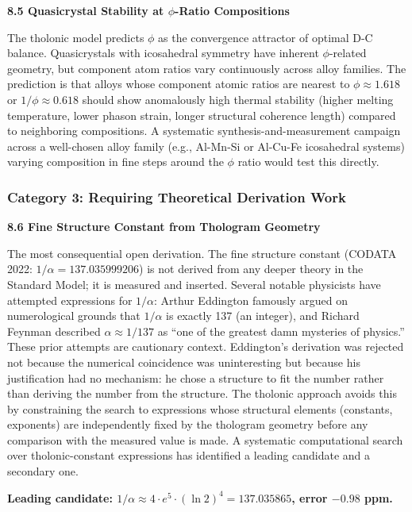 \documentclass[12pt]{article}
\begin{document}
\textbf{8.5 Quasicrystal Stability at \(\phi\)-Ratio Compositions}

The tholonic model predicts \(\phi\) as the convergence attractor of
optimal D-C balance. Quasicrystals with icosahedral symmetry have
inherent \(\phi\)-related geometry, but component atom ratios vary
continuously across alloy families. The prediction is that alloys whose
component atomic ratios are nearest to \(\phi \approx 1.618\) or
\(1/\phi \approx 0.618\) should show anomalously high thermal stability
(higher melting temperature, lower phason strain, longer structural
coherence length) compared to neighboring compositions. A systematic
synthesis-and-measurement campaign across a well-chosen alloy family
(e.g., Al-Mn-Si or Al-Cu-Fe icosahedral systems) varying composition in
fine steps around the \(\phi\) ratio would test this directly.

\subsubsection{Category 3: Requiring Theoretical Derivation
Work}\label{category-3-requiring-theoretical-derivation-work}

\textbf{8.6 Fine Structure Constant from Thologram Geometry}

The most consequential open derivation. The fine structure constant
(CODATA 2022: \(1/\alpha = 137.035999206\)) is not derived from any
deeper theory in the Standard Model; it is measured and inserted.
Several notable physicists have attempted expressions for \(1/\alpha\):
Arthur Eddington famously argued on numerological grounds that
\(1/\alpha\) is exactly 137 (an integer), and Richard Feynman described
\(\alpha \approx 1/137\) as ``one of the greatest damn mysteries of
physics.'' These prior attempts are cautionary context. Eddington's
derivation was rejected not because the numerical coincidence was
uninteresting but because his justification had no mechanism: he chose a
structure to fit the number rather than deriving the number from the
structure. The tholonic approach avoids this by constraining the search
to expressions whose structural elements (constants, exponents) are
independently fixed by the thologram geometry before any comparison with
the measured value is made. A systematic computational search over
tholonic-constant expressions has identified a leading candidate and a
secondary one.

\textbf{Leading candidate:
\(1/\alpha \approx 4 \cdot e^5 \cdot (\ln 2)^4 = 137.035865\), error
\(-0.98\) ppm.}
\end{document}
